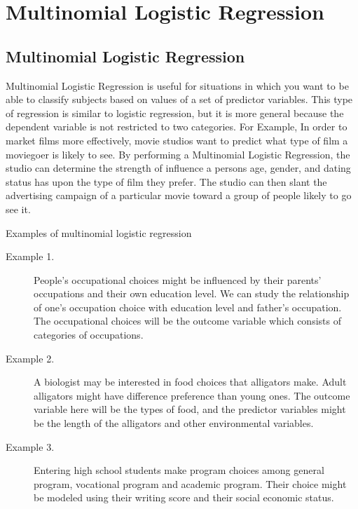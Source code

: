\section{Multinomial Logistic Regression}
\subsection{Multinomial Logistic Regression}
Multinomial Logistic Regression is useful for situations in which you want to be able to classify
subjects based on values of a set of predictor variables. This type of regression is similar to logistic
regression, but it is more general because the dependent variable is not restricted to two categories.
For Example, In order to market films more effectively, movie studios want to predict what type of
film a moviegoer is likely to see. By performing a Multinomial Logistic Regression, the studio
can determine the strength of influence a persons age, gender, and dating status has upon the type
of film they prefer. The studio can then slant the advertising campaign of a particular movie
toward a group of people likely to go see it.
\newpage

Examples of multinomial logistic regression

\begin{description}
	\item[Example 1.] People's occupational choices might be influenced by their parents' occupations and their own education level. We can study the relationship of one's occupation choice with education level and father's occupation.  The occupational choices will be the outcome variable which consists of categories of occupations.
	
	\item[Example 2.] A biologist may be interested in food choices that alligators make. Adult alligators might have difference preference than young ones. The outcome variable here will be the types of food, and the predictor variables might be the length of the alligators and other environmental variables.
	
	\item[Example 3.] Entering high school students make program choices among general program, vocational program and academic program. Their choice might be modeled using their writing score and their social economic status.
\end{description}